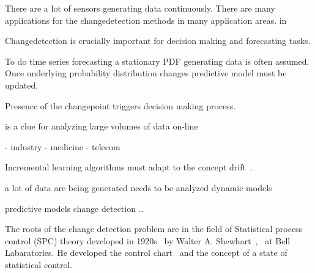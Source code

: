 There are a lot of sensors generating data continuously.
There are many applications for the changedetection methods in many application areas. 
in 

Changedetection is crucially important for decision making and forecasting tasks.

To do time series forecasting a stationary PDF generating data is often assumed.
Once underlying probability distribution changes predictive model must be updated.

Presence of the changepoint triggers decision making process.

\cd is a clue for analyzing large volumes of data on-line 

- industry 
- medicine 
- telecom~\cite{gama2010knowledge}



Incremental learning algorithms must adapt to the concept
drift~\cite{gama2010knowledge}.


a lot of data are being generated 
needs to be analyzed 
dynamic models 

predictive models
change detection ..


The roots of the change detection problem are in the field of Statistical process control (SPC) theory developed in
1920s~\cite{TartakovskySeq} by Walter A.  Shewhart~\cite{shewhart1931economic},~\cite{shewhart1931economic} at Bell
Labaratories.  He developed the control chart~\cite{shewhart1926quality} and the concept of a state of statistical
control.


